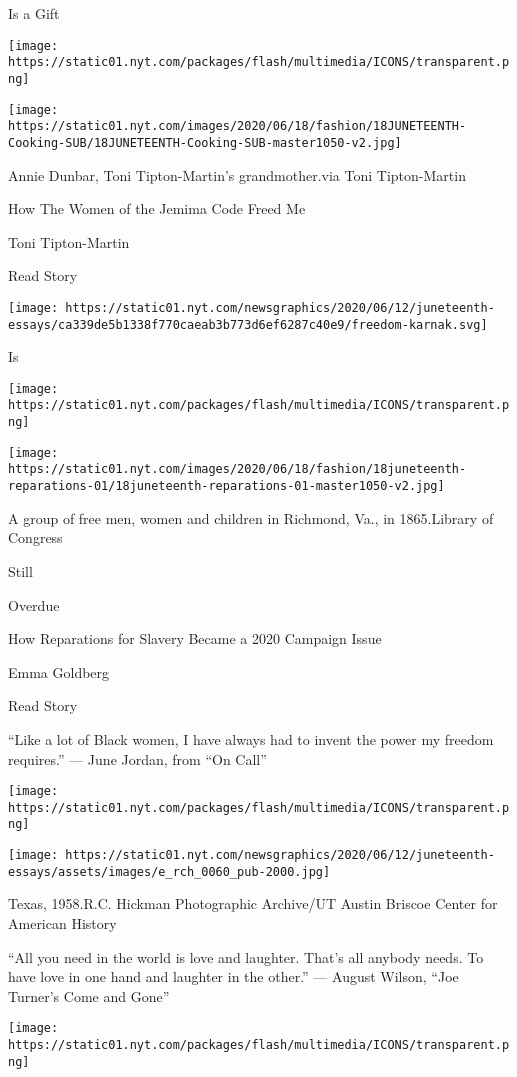 Is a Gift

\texttt{[image: https://static01.nyt.com/packages/flash/multimedia/ICONS/transparent.png]}

\texttt{[image: https://static01.nyt.com/images/2020/06/18/fashion/18JUNETEENTH-Cooking-SUB/18JUNETEENTH-Cooking-SUB-master1050-v2.jpg]}

Annie Dunbar, Toni Tipton-Martin's grandmother.via Toni Tipton-Martin

How The Women of the Jemima Code Freed Me

Toni Tipton-Martin

Read Story

\href{https://www.nytimes.com/2020/06/18/us/politics/reparations-slavery.html}{}

\texttt{[image: https://static01.nyt.com/newsgraphics/2020/06/12/juneteenth-essays/ca339de5b1338f770caeab3b773d6ef6287c40e9/freedom-karnak.svg]}

Is

\texttt{[image: https://static01.nyt.com/packages/flash/multimedia/ICONS/transparent.png]}

\texttt{[image: https://static01.nyt.com/images/2020/06/18/fashion/18juneteenth-reparations-01/18juneteenth-reparations-01-master1050-v2.jpg]}

A group of free men, women and children in Richmond, Va., in
1865.Library of Congress

Still

Overdue

How Reparations for Slavery Became a 2020 Campaign Issue

Emma Goldberg

Read Story

``Like a lot of Black women, I have always had to invent the power my
freedom requires.'' --- June Jordan, from ``On Call''

\texttt{[image: https://static01.nyt.com/packages/flash/multimedia/ICONS/transparent.png]}

\texttt{[image: https://static01.nyt.com/newsgraphics/2020/06/12/juneteenth-essays/assets/images/e\_rch\_0060\_pub-2000.jpg]}

Texas, 1958.R.C. Hickman Photographic Archive/UT Austin Briscoe Center
for American History

``All you need in the world is love and laughter. That's all anybody
needs. To have love in one hand and laughter in the other.'' --- August
Wilson, ``Joe Turner's Come and Gone''

\texttt{[image: https://static01.nyt.com/packages/flash/multimedia/ICONS/transparent.png]}


